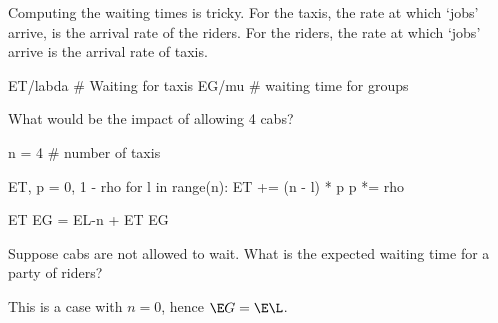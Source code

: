\begin{exercise}[Hall 5.22]
\begin{solution}
Computing the waiting times is tricky. For the taxis, the rate at which `jobs' arrive, is the arrival rate of the riders. For the riders, the rate at which `jobs' arrive is the arrival rate of taxis.
\begin{pyconsole}
ET/labda # Waiting for taxis
EG/mu # waiting time for groups
\end{pyconsole}

What would be the impact of allowing 4 cabs?
\begin{pyconsole}
n = 4  # number of taxis

ET, p = 0, 1 - rho
for l in range(n):
    ET += (n - l) * p
    p *= rho

ET
EG = EL-n + ET
EG
\end{pyconsole}
\end{solution}
\end{exercise}


\begin{exercise}
Suppose cabs are not allowed to wait. What is the expected waiting time for a party of riders?

\begin{solution}
This is a case with $n=0$, hence $\E G = \E \L$.
\end{solution}
\end{exercise}

